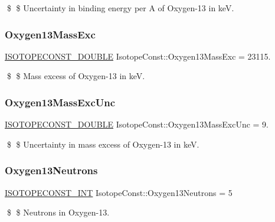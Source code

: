 \$ \$ Uncertainty in binding energy per A of Oxygen-\/13 in keV. \mbox{\label{group___isotope_const-_oxygen-_o13_gaa1b8e237076605bed42426158ace91c2}} 
\subsubsection{\texorpdfstring{Oxygen13\+Mass\+Exc}{Oxygen13MassExc}}
{\footnotesize\ttfamily \mbox{\hyperlink{group___isotope_const-_macros_ga8f45a7272ce02c0b4c65c44636ed719a}{I\+S\+O\+T\+O\+P\+E\+C\+O\+N\+S\+T\+\_\+\+D\+O\+U\+B\+LE}} Isotope\+Const\+::\+Oxygen13\+Mass\+Exc = 23115.}

\$ \$ Mass excess of Oxygen-\/13 in keV. \mbox{\label{group___isotope_const-_oxygen-_o13_gaccee53dec94330330271c5db7fca76bf}} 
\subsubsection{\texorpdfstring{Oxygen13\+Mass\+Exc\+Unc}{Oxygen13MassExcUnc}}
{\footnotesize\ttfamily \mbox{\hyperlink{group___isotope_const-_macros_ga8f45a7272ce02c0b4c65c44636ed719a}{I\+S\+O\+T\+O\+P\+E\+C\+O\+N\+S\+T\+\_\+\+D\+O\+U\+B\+LE}} Isotope\+Const\+::\+Oxygen13\+Mass\+Exc\+Unc = 9.}

\$ \$ Uncertainty in mass excess of Oxygen-\/13 in keV. \mbox{\label{group___isotope_const-_oxygen-_o13_gae3c27b41b4dfa77581927ad0dbad9e7b}} 
\subsubsection{\texorpdfstring{Oxygen13\+Neutrons}{Oxygen13Neutrons}}
{\footnotesize\ttfamily \mbox{\hyperlink{group___isotope_const-_macros_ga5f18360b3e99483a35c32d789e62621c}{I\+S\+O\+T\+O\+P\+E\+C\+O\+N\+S\+T\+\_\+\+I\+NT}} Isotope\+Const\+::\+Oxygen13\+Neutrons = 5}

\$ \$ Neutrons in Oxygen-\/13. \mbox{\label{group___isotope_const-_oxygen-_o13_ga7dc4ea17562e493db140c9327d07f617}} 
